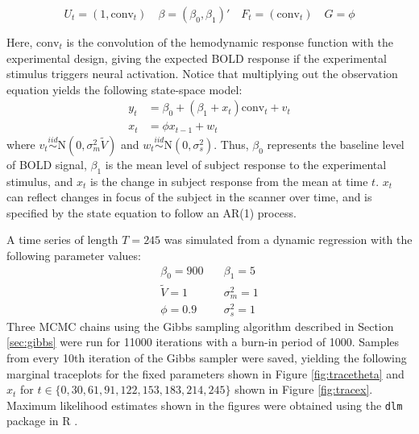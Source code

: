 \documentclass{article}
\begin{document}
\begin{equation}
U_t = (1, \mbox{conv}_t) \quad \beta = (\beta_0,\beta_1)' \quad F_t = (\mbox{conv}_t) \quad G = \phi \label{eqn:dr}
\end{equation}

\noindent Here, $\mbox{conv}_t$ is the convolution of the hemodynamic response function with the experimental design, giving the expected BOLD response if the experimental stimulus triggers neural activation. Notice that multiplying out the observation equation yields the following state-space model:
\begin{align*}
y_t &= \beta_0 + (\beta_1 + x_t)\mbox{conv}_t + v_t \\
x_t &= \phi x_{t-1} + w_t
\end{align*}
\noindent where $v_t \stackrel{iid}{\sim} \mbox{N}(0,\sigma^2_m\tilde{V})$ and $w_t \stackrel{iid}{\sim} \mbox{N}(0,\sigma^2_s)$.
Thus, $\beta_0$ represents the baseline level of BOLD signal, $\beta_1$ is the mean level of subject response to the experimental stimulus, and $x_t$ is the change in subject response from the mean at time $t$. $x_t$ can reflect changes in focus of the subject in the scanner over time, and is specified by the state equation to follow an AR(1) process.

A time series of length $T = 245$ was simulated from a dynamic regression with the following parameter values:
\begin{align*}
\beta_0 = 900 &\quad \beta_1 = 5 \\
\tilde{V} = 1 &\quad \sigma_m^2 = 1 \\
\phi = 0.9 &\quad \sigma_s^2 = 1
\end{align*}
Three MCMC chains using the Gibbs sampling algorithm described in Section \ref{sec:gibbs} were run for 11000 iterations with a burn-in period of 1000. Samples from every 10th iteration of the Gibbs sampler were saved, yielding the following marginal traceplots for the fixed parameters shown in Figure \ref{fig:tracetheta} and $x_t$ for $t \in \{0, 30, 61, 91, 122, 153, 183, 214, 245\}$ shown in Figure \ref{fig:tracex}. Maximum likelihood estimates shown in the figures were obtained using the {\tt dlm} package in R \citep{petris2009dynamic}.
\end{document}
